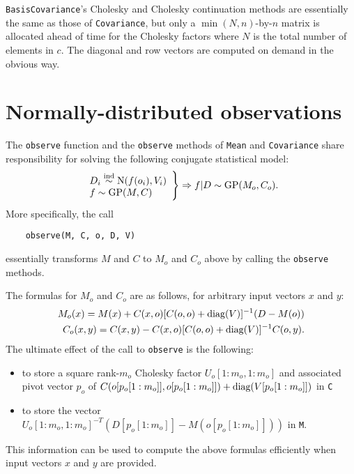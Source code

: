 \documentclass{report}
\begin{document}
\texttt{BasisCovariance}'s Cholesky and Cholesky continuation methods are essentially the same as those of \texttt{Covariance}, but only a $\min (N,n)$-by-$n$ matrix is allocated ahead of time for the Cholesky factors where $N$ is the total number of elements in $c$. The diagonal and row vectors are computed on demand in the obvious way.

\section{Normally-distributed observations}\label{sec:obs}

The \texttt{observe} function and the \texttt{observe} methods of \texttt{Mean} and \texttt{Covariance} share responsibility for solving the following conjugate statistical model:
\begin{equation}
    \label{regprior}
    \left.\begin{array}{l}
        D_i \stackrel{\tiny{\textup{ind}}}{\sim} \textup{N}(f(o_i), V_i)\\
        f \sim \textup{GP}(M,C)\\
    \end{array}\right\}\Rightarrow f|D \sim \textup{GP}(M_o, C_o).
\end{equation}
More specifically, the call 
\begin{verbatim}
    observe(M, C, o, D, V)
\end{verbatim}
essentially transforms $M$ and $C$ to $M_o$ and $C_o$ above by calling the \texttt{observe} methods.

The formulas for $M_o$ and $C_o$ are as follows, for arbitrary input vectors $x$ and $y$:
\begin{eqnarray*}
    M_o(x) = M(x) + C(x,o)[C(o,o) + \textup{diag}(V)]^{-1}(D-M(o))\\
    C_o(x,y) = C(x,y) - C(x,o)[C(o,o) + \textup{diag}(V)]^{-1}C(o,y).
\end{eqnarray*}
The ultimate effect of the call to \texttt{observe} is the following:
\begin{itemize}
    \item to store a square rank-$m_o$ Cholesky factor $U_o[1:m_o,1:m_o]$ and associated pivot vector $p_o$ of $C(o[p_o[1:m_o]],o[p_o[1:m_o]]) + \textup{diag}(V[p_o[1:m_o]])$ in \texttt{C}
    \item to store the vector $U_o[1:m_o,1:m_o]^{-T}(D[p_o[1:m_o]] - M(o[p_o[1:m_o]]))$ in \texttt{M}.
\end{itemize}
This information can be used to compute the above formulas efficiently when input vectors $x$ and $y$ are provided.
\end{document}
